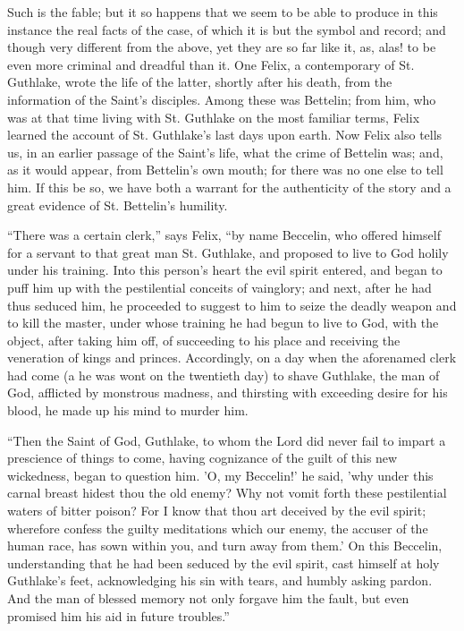 Such is the fable; but it so happens that we seem
to be able to produce in this instance the real facts of the case, of
which it is but the symbol and record; and though very different from
the above, yet they are so far like it, as, alas! to be even more
criminal and dreadful than it. One Felix, a contemporary of St.
Guthlake, wrote the life of the latter, shortly after his death, from
the information of the Saint's disciples. Among these was Bettelin;
from him, who was at that time living with St. Guthlake on the most
familiar terms, Felix learned the account of St. Guthlake's last days
upon earth. Now Felix also tells us, in an earlier passage of the
Saint's life, what the crime of Bettelin was; and, as it would appear,
from Bettelin's own mouth; for there was no one else to tell him. If
this be so, we have both a warrant for the authenticity of the story
and a great evidence of St. Bettelin's humility.

``There was a certain clerk,'' says Felix, ``by name
Beccelin, who offered himself for a servant to that great man St.
Guthlake, and proposed to live to God holily under his training. Into
this person's heart the evil spirit entered, and began to puff him up
with the pestilential conceits of vainglory; and next, after he had
thus seduced him, he proceeded to suggest to him to seize the deadly
weapon and to kill the master, under whose training he had begun to
live to God, with the object, after taking him off, of succeeding to
his place and receiving the veneration of kings and princes.
Accordingly, on a day when the aforenamed clerk had come (a he was
wont on the twentieth day) to shave Guthlake, the man of God,
afflicted by monstrous madness, and thirsting with exceeding desire
for his blood, he made up his mind to murder him.

``Then the Saint of God, Guthlake, to whom the
Lord did never fail to impart a prescience of things to come, having
cognizance of the guilt of this new wickedness, began to question him.
'O, my Beccelin!' he said, 'why under this carnal breast hidest thou
the old enemy? Why not vomit forth these pestilential waters of bitter
poison? For I know that thou art deceived by the evil spirit;
wherefore confess the guilty meditations which our enemy, the accuser
of the human race, has sown within you, and turn away from them.' On
this Beccelin, understanding that he had been seduced by the evil
spirit, cast himself at holy Guthlake's feet, acknowledging his sin
with tears, and humbly asking pardon. And the man of blessed memory
not only forgave him the fault, but even promised him his aid in
future troubles.''

